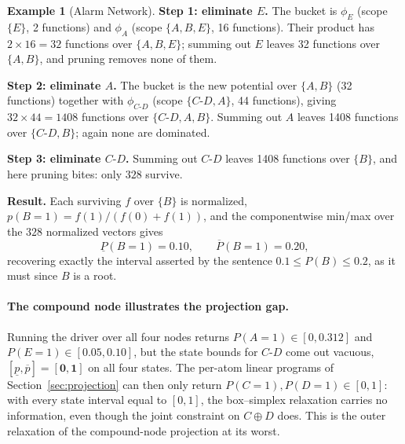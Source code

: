 \documentclass[11pt]{article}
\theoremstyle{definition}
\newtheorem{example}{Example}
\begin{document}
\begin{example}[Alarm Network]
\textbf{Step 1: eliminate $E$.}
The bucket is $\phi_E$ (scope $\{E\}$, 2 functions) and $\phi_A$ (scope
$\{A,B,E\}$, 16 functions). Their product has $2 \times 16 = 32$ functions over
$\{A,B,E\}$; summing out $E$ leaves 32 functions over $\{A,B\}$, and pruning
removes none of them.

\textbf{Step 2: eliminate $A$.}
The bucket is the new potential over $\{A,B\}$ (32 functions) together with
$\phi_{C\text{-}D}$ (scope $\{C\text{-}D, A\}$, 44 functions), giving
$32 \times 44 = 1408$ functions over $\{C\text{-}D, A, B\}$. Summing out $A$
leaves 1408 functions over $\{C\text{-}D, B\}$; again none are dominated.

\textbf{Step 3: eliminate $C\text{-}D$.}
Summing out $C\text{-}D$ leaves 1408 functions over $\{B\}$, and here pruning
bites: only $328$ survive.

\textbf{Result.} Each surviving $f$ over $\{B\}$ is normalized,
$p(B{=}1) = f(1)/(f(0)+f(1))$, and the componentwise min/max over the $328$
normalized vectors gives
\[
  \underline{P}(B{=}1) = 0.10, \qquad \overline{P}(B{=}1) = 0.20 ,
\]
recovering exactly the interval asserted by the sentence
$0.1 \le P(B) \le 0.2$, as it must since $B$ is a root.

\paragraph{The compound node illustrates the projection gap.}
Running the driver over all four nodes returns $P(A{=}1) \in [0, 0.312]$ and
$P(E{=}1) \in [0.05, 0.10]$, but the state bounds for $C\text{-}D$ come out
vacuous, $[\underline{p}, \overline{p}] = [\mathbf{0}, \mathbf{1}]$ on all four
states. The per-atom linear programs of Section~\ref{sec:projection} can then
only return $P(C{=}1), P(D{=}1) \in [0,1]$: with every
state interval equal to $[0,1]$, the box--simplex relaxation carries no
information, even though the joint constraint on $C \oplus D$ does. This is the
outer relaxation of the compound-node projection at its worst.
\end{example}

\end{document}

